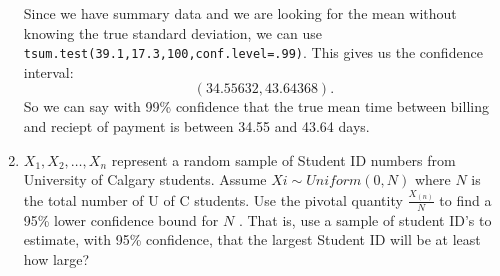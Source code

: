 \documentclass{article}
\begin{document}
\begin{enumerate}
    Since we have summary data and we are looking for the mean without knowing the true standard deviation, we can use \verb|tsum.test(39.1,17.3,100,conf.level=.99)|. This gives us the confidence interval:
    $$\left(34.55632,43.64368 \right) .$$
    So we can say with 99\% confidence that the true mean time between billing and reciept of payment is between 34.55 and 43.64 days.

\item $X_1, X_2, \ldots , X_n$ represent a random sample of Student ID numbers from University of
Calgary students. Assume $Xi \sim Uniform(0, N )$ where $N$ is the total number of U of C students.
Use the pivotal quantity $\frac{X_{(n)}}{N}$ to find a 95\% lower confidence bound for $N$ . That is, use a sample of student ID’s to estimate, with 95\% confidence, that the largest Student ID will be at least how large? 

\end{enumerate}
\end{document}
